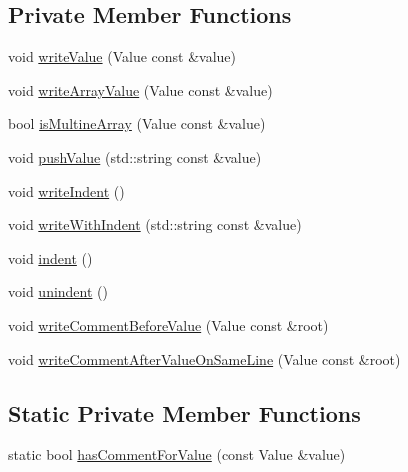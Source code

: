 \subsection*{Private Member Functions}
\begin{DoxyCompactItemize}
\item 
void \hyperlink{struct_json_1_1_built_styled_stream_writer_a7c9da861861e570a51b45f270c9ff150}{write\+Value} (Value const \&value)
\item 
void \hyperlink{struct_json_1_1_built_styled_stream_writer_acd20e9274bbcf7876ef3af2e7d23a31f}{write\+Array\+Value} (Value const \&value)
\item 
bool \hyperlink{struct_json_1_1_built_styled_stream_writer_af423fd33b3d580506ea3efc53b05a077}{is\+Multine\+Array} (Value const \&value)
\item 
void \hyperlink{struct_json_1_1_built_styled_stream_writer_a53de0fe57c883d621c7255e49248651e}{push\+Value} (std\+::string const \&value)
\item 
void \hyperlink{struct_json_1_1_built_styled_stream_writer_a2b38a3714d415c4bd3b4812897130f3d}{write\+Indent} ()
\item 
void \hyperlink{struct_json_1_1_built_styled_stream_writer_a764c6d530b5bd660c4a7d1ad4eff6b8d}{write\+With\+Indent} (std\+::string const \&value)
\item 
void \hyperlink{struct_json_1_1_built_styled_stream_writer_a73e09692a2cfbd6e67836b060dc34a9f}{indent} ()
\item 
void \hyperlink{struct_json_1_1_built_styled_stream_writer_a0da6c6f603e00c8c6e38af553edd8c55}{unindent} ()
\item 
void \hyperlink{struct_json_1_1_built_styled_stream_writer_a32c4afca4e08fba79bb0a80a8010283a}{write\+Comment\+Before\+Value} (Value const \&root)
\item 
void \hyperlink{struct_json_1_1_built_styled_stream_writer_a89625b134fce0255263ca40e6125742b}{write\+Comment\+After\+Value\+On\+Same\+Line} (Value const \&root)
\end{DoxyCompactItemize}
\subsection*{Static Private Member Functions}
\begin{DoxyCompactItemize}
\item 
static bool \hyperlink{struct_json_1_1_built_styled_stream_writer_a457c2f3c1e8c952caeb60e52477d0c9a}{has\+Comment\+For\+Value} (const Value \&value)
\end{DoxyCompactItemize}
